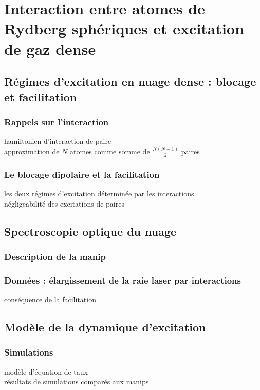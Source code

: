 \chapter{Interaction entre atomes de Rydberg sphériques et excitation de gaz dense}
\label{chapter:60s}

\section{Régimes d'excitation en nuage dense : blocage et facilitation}
	\subsection{Rappels sur l'interaction}
		\noindent hamiltonien d'interaction de paire \\
		approximation de $N$ atomes comme somme de $\frac{N(N-1)}{2}$ paires
	\subsection{Le blocage dipolaire et la facilitation}
		\noindent les deux régimes d'excitation déterminée par les interactions \\
		négligeabilité des excitations de paires		

\section{Spectroscopie optique du nuage}
	\subsection{Description de la manip}
	\subsection{Données : élargissement de la raie laser par interactions}
		\noindent conséquence de la facilitation
		
\section{Modèle de la dynamique d'excitation}
	\subsection{Simulations}
		\noindent modèle d'équation de taux\\
		\noindent résultats de simulations comparés aux manips\\
